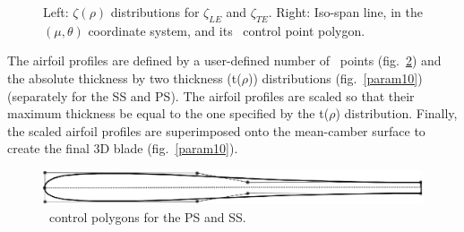 \begin{figure}[h!]
\begin{minipage}[b]{1\linewidth}
 \centering
\end{minipage}
\caption{Left: $\zeta(\rho)$ distributions for $\zeta_{LE}$ and $\zeta_{TE}$. Right: Iso-span line, in the $(\mu,\theta)$ coordinate system, and its \Bezier\ control point polygon.}
\label{param7}
\end{figure}

The airfoil profiles are defined by a user-defined number of \Bezier\ points (fig.\ \ref{param8}) and the absolute thickness by two thickness (t($\rho$)) distributions (fig.\ \ref{param10}) (separately for the SS and PS). The airfoil profiles are scaled so that their maximum thickness be equal to the one specified by the t($\rho$) distribution. Finally, the scaled airfoil profiles are superimposed onto the mean-camber surface to create the final 3D blade (fig.\ \ref{param10}).  

\begin{figure}[h!]
\centering
\includegraphics[width=150mm]{param8.eps} 
\caption{\Bezier\ control polygons for the PS and SS.}
\label{param8}
\end{figure}



